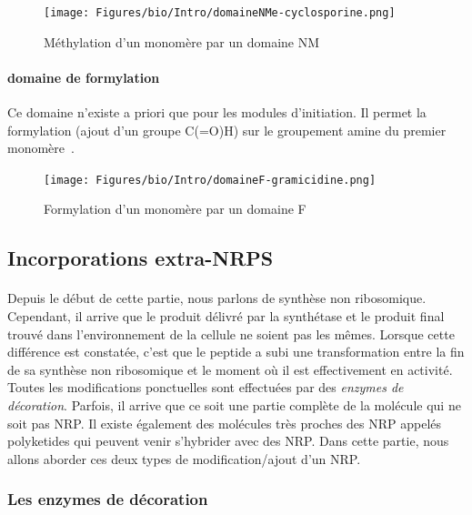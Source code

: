 \documentclass[12pt,french,twoside]{report}
\begin{document}
\begin{figure}[h!]
  \begin{center}
    \texttt{[image: Figures/bio/Intro/domaineNMe-cyclosporine.png]}
    \caption{\label{domaine_NMe}Méthylation d'un monomère par un domaine NM}
  \end{center}
\end{figure}

\paragraph{domaine de formylation}

Ce domaine n'existe a priori que pour les modules d'initiation.
Il permet la formylation (ajout d'un groupe C(=O)H) sur le groupement amine du premier monomère~\cite{schonafinger_amide_2007}.

\begin{figure}[h!]
  \begin{center}
    \texttt{[image: Figures/bio/Intro/domaineF-gramicidine.png]}
    \caption{\label{domaine_F}Formylation d'un monomère par un domaine F}
  \end{center}
\end{figure}


\subsection{Incorporations extra-NRPS}

\paragraph{}Depuis le début de cette partie, nous parlons de synthèse non ribosomique.
Cependant, il arrive que le produit délivré par la synthétase et le produit final trouvé dans l'environnement de la cellule ne soient pas les mêmes.
Lorsque cette différence est constatée, c'est que le peptide a subi une transformation entre la fin de sa synthèse non ribosomique et le moment où il est effectivement en activité.
Toutes les modifications ponctuelles sont effectuées par des \textit{enzymes de décoration}.
Parfois, il arrive que ce soit une partie complète de la molécule qui ne soit pas NRP.
Il existe également des molécules très proches des NRP appelés polyketides qui peuvent venir s'hybrider avec des NRP.
Dans cette partie, nous allons aborder ces deux types de modification/ajout d'un NRP.


\subsubsection{Les enzymes de décoration}
\end{document}
